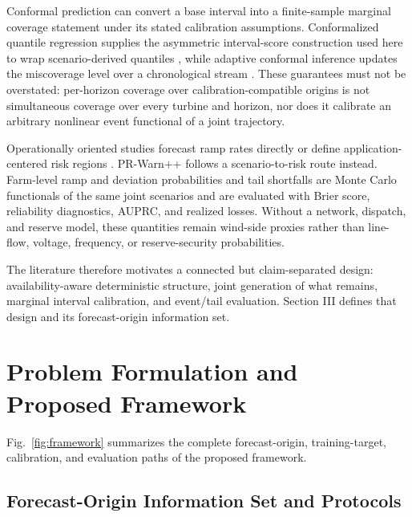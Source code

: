 \documentclass[journal]{IEEEtran}
\begin{document}
Conformal prediction can convert a base interval into a finite-sample marginal coverage statement under its stated calibration assumptions. Conformalized quantile regression supplies the asymmetric interval-score construction used here to wrap scenario-derived quantiles \cite{romano2019cqr}, while adaptive conformal inference updates the miscoverage level over a chronological stream \cite{gibbs2021aci}. These guarantees must not be overstated: per-horizon coverage over calibration-compatible origins is not simultaneous coverage over every turbine and horizon, nor does it calibrate an arbitrary nonlinear event functional of a joint trajectory.

Operationally oriented studies forecast ramp rates directly \cite{ko2026ramp} or define application-centered risk regions \cite{yang2025risk}. PR-Warn++ follows a scenario-to-risk route instead. Farm-level ramp and deviation probabilities and tail shortfalls are Monte Carlo functionals of the same joint scenarios and are evaluated with Brier score, reliability diagnostics, AUPRC, and realized losses. Without a network, dispatch, and reserve model, these quantities remain wind-side proxies rather than line-flow, voltage, frequency, or reserve-security probabilities.

The literature therefore motivates a connected but claim-separated design: availability-aware deterministic structure, joint generation of what remains, marginal interval calibration, and event/tail evaluation. Section III defines that design and its forecast-origin information set.

\section{Problem Formulation and Proposed Framework}

Fig.~\ref{fig:framework} summarizes the complete forecast-origin, training-target, calibration, and evaluation paths of the proposed framework.

\subsection{Forecast-Origin Information Set and Protocols}
\end{document}
